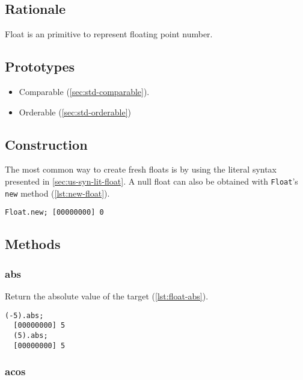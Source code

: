 \subsection{Rationale}

Float is an \us primitive to represent floating point number.

\subsection{Prototypes}

\begin{itemize}
\item Comparable (\autoref{sec:std-comparable}).
\item Orderable (\autoref{sec:std-orderable})
\end{itemize}

\subsection{Construction}

The most common way to create fresh floats is by using the literal
syntax presented in \autoref{sec:us-syn-lit-float}. A null float can also be
obtained with \lstinline|Float|'s \lstinline|new| method
(\autoref{lst:new-float}).

\begin{lstlisting}[caption=Creating a new float, label=lst:new-float,
  float=\floatpos]
  Float.new; [00000000] 0
\end{lstlisting}

\subsection{Methods}


\subsubsection{abs}

Return the absolute value of the target (\autoref{lst:float-abs}).

\begin{lstlisting}[caption=Float.abs, label=lst:float-abs,
  float=\floatposh]
  (-5).abs;
  [00000000] 5
  (5).abs;
  [00000000] 5
\end{lstlisting}

\subsubsection{acos}

